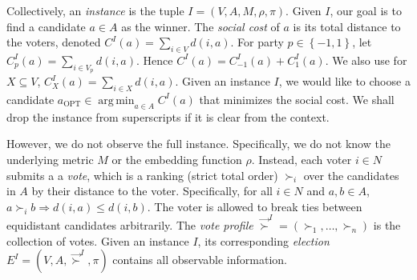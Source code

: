 \documentclass[letterpaper]{article} %
\theoremstyle{definition}
\newcommand{\set}[1]{\left\{#1\right\}}
\renewcommand{\vec}{\overrightarrow}
\DeclareMathOperator*{\argmin}{\arg\,\min}
\newcommand{\vsucc}{\vec{\succ}}
\newcommand{\pleft}{-1}
\newcommand{\pright}{1}
\newcommand{\opt}{{\textrm{OPT}}}
\begin{document}
Collectively, an \emph{instance} is the tuple $I = (V,A,M,\rho,\pi)$. Given $I$, our goal is to find a candidate $a \in A$ as the winner. The \emph{social cost} of $a$ is its total distance to the voters, denoted $C^I(a) = \sum_{i \in V} d(i,a)$. For party $p \in \set{\pleft,\pright}$, let $C^I_p(a) = \sum_{i \in V_p} d(i,a)$. Hence $C^I(a) = C^I_{\pleft}(a) + C^I_{\pright}(a)$. We also use for $X \subseteq V$, $C^I_X(a) = \sum_{i \in X} d(i,a)$. Given an instance $I$, we would like to choose a candidate $a_{\opt} \in \argmin_{a \in A} C^I(a)$ that minimizes the social cost. We shall drop the instance from superscripts if it is clear from the context.

However, we do not observe the full instance. Specifically, we do not know the underlying metric $M$ or the embedding function $\rho$. Instead, each voter $i \in N$ submits a a \emph{vote}, which is a ranking (strict total order) $\succ_i$ over the candidates in $A$ by their distance to the voter. Specifically, for all $i \in N$ and $a,b \in A$, $a \succ_i b \Rightarrow d(i,a) \le d(i,b)$. The voter is allowed to break ties between equidistant candidates arbitrarily. The \emph{vote profile} $\vsucc^I = (\succ_1,\ldots,\succ_n)$ is the collection of votes. Given an instance $I$, its corresponding \emph{election} $E^I = (V,A,\vsucc^I,\pi)$ contains all observable information.
\end{document}

